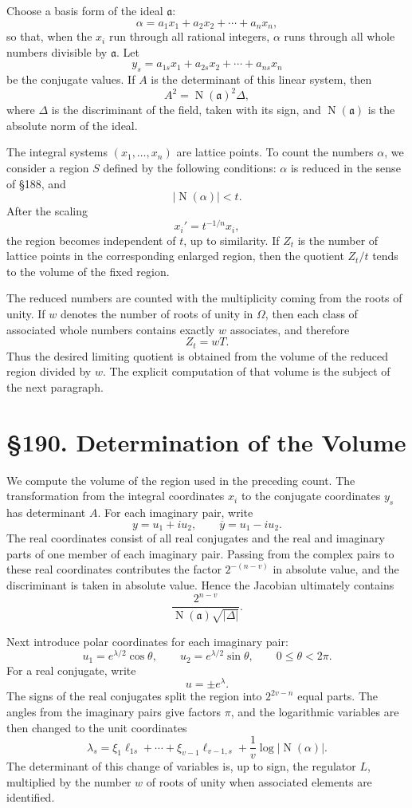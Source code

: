 \documentclass[11pt,a4paper]{book}
\newcommand{\webersection}[2]{\clearpage\section*{\S #1. #2}}
\providecommand{\ideala}{\mathfrak a}
\providecommand{\N}{\operatorname{N}}
\begin{document}
Choose a basis form of the ideal \(\ideala\):
\[
  \alpha=a_1x_1+a_2x_2+\cdots+a_nx_n,
\tag{1}
\]
so that, when the \(x_i\) run through all rational integers, \(\alpha\) runs through all whole numbers divisible by \(\ideala\).  Let
\[
  y_s=a_{1s}x_1+a_{2s}x_2+\cdots+a_{ns}x_n
\tag{2}
\]
be the conjugate values.  If \(A\) is the determinant of this linear system, then
\[
  A^2=
\N(\ideala)^2\Delta,
\tag{3}
\]
where \(\Delta\) is the discriminant of the field, taken with its sign, and \(\N(\ideala)\) is the absolute norm of the ideal.

The integral systems \((x_1,
\ldots,x_n)\) are lattice points.  To count the numbers \(\alpha\), we consider a region \(S\) defined by the following conditions: \(\alpha\) is reduced in the sense of \S188, and
\[
  |
\N(\alpha)|<t.
\tag{4}
\]
After the scaling
\[
  x_i'=t^{-1/n}x_i,
\]
the region becomes independent of \(t\), up to similarity.  If \(Z_t\) is the number of lattice points in the corresponding enlarged region, then the quotient \(Z_t/t\) tends to the volume of the fixed region.

The reduced numbers are counted with the multiplicity coming from the roots of unity.  If \(w\) denotes the number of roots of unity in \(\Omega\), then each class of associated whole numbers contains exactly \(w\) associates, and therefore
\[
  Z_t=wT.
\tag{5}
\]
Thus the desired limiting quotient is obtained from the volume of the reduced region divided by \(w\).  The explicit computation of that volume is the subject of the next paragraph.

\webersection{190}{Determination of the Volume}

We compute the volume of the region used in the preceding count.  The transformation from the integral coordinates \(x_i\) to the conjugate coordinates \(y_s\) has determinant \(A\).  For each imaginary pair, write
\[
  y=u_1+iu_2,
\qquad \overline y=u_1-iu_2.
\tag{1}
\]
The real coordinates consist of all real conjugates and the real and imaginary parts of one member of each imaginary pair.  Passing from the complex pairs to these real coordinates contributes the factor \(2^{-(n-v)}\) in absolute value, and the discriminant is taken in absolute value.  Hence the Jacobian ultimately contains
\[
  \frac{2^{n-v}}{\N(\ideala)\sqrt{|\Delta|}}.
\tag{2}
\]

Next introduce polar coordinates for each imaginary pair:
\[
  u_1=e^{\lambda/2}\cos\theta,
\qquad
  u_2=e^{\lambda/2}\sin\theta,
\qquad 0\le\theta<2\pi.
\tag{3}
\]
For a real conjugate, write
\[
  u=\pm e^\lambda.
\tag{4}
\]
The signs of the real conjugates split the region into \(2^{2v-n}\) equal parts.  The angles from the imaginary pairs give factors \(\pi\), and the logarithmic variables are then changed to the unit coordinates
\[
  \lambda_s=\xi_1\ell_{1s}+\cdots+\xi_{v-1}\ell_{v-1,s}+\frac{1}{v}\log|
\N(\alpha)|.
\tag{5}
\]
The determinant of this change of variables is, up to sign, the regulator \(L\), multiplied by the number \(w\) of roots of unity when associated elements are identified.
\end{document}
